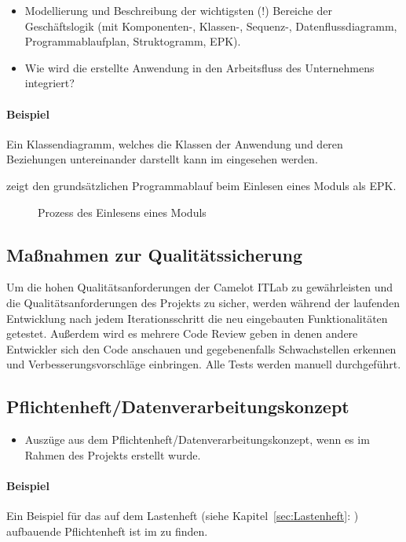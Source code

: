 \begin{itemize}
	\item Modellierung und Beschreibung der wichtigsten (!) Bereiche der Geschäftslogik (\zB mit Kom\-po\-nen\-ten-, Klassen-, Sequenz-, Datenflussdiagramm, Programmablaufplan, Struktogramm, \ac{EPK}).
	\item Wie wird die erstellte Anwendung in den Arbeitsfluss des Unternehmens integriert?
\end{itemize}

\paragraph{Beispiel}
Ein Klassendiagramm, welches die Klassen der Anwendung und deren Beziehungen untereinander darstellt kann im  eingesehen werden.

 zeigt den grundsätzlichen Programmablauf beim Einlesen eines Moduls als \ac{EPK}.
\begin{figure}[htb]
\centering
{}
\caption{Prozess des Einlesens eines Moduls}
\label{fig:Modulimport}
\end{figure}


\subsection{Maßnahmen zur Qualitätssicherung}
\label{sec:Qualitaetssicherung}
Um die hohen Qualitätsanforderungen der Camelot ITLab zu gewährleisten und die Qualitätsanforderungen des Projekts zu sicher, werden während der laufenden Entwicklung nach jedem Iterationsschritt die neu eingebauten Funktionalitäten getestet. Außerdem wird es mehrere Code Review geben in denen andere Entwickler sich den Code anschauen und gegebenenfalls Schwachstellen erkennen und Verbesserungsvorschläge einbringen. Alle Tests werden manuell durchgeführt.  


\subsection{Pflichtenheft/Datenverarbeitungskonzept}
\label{sec:Pflichtenheft}
\begin{itemize}
	\item Auszüge aus dem Pflichtenheft/Datenverarbeitungskonzept, wenn es im Rahmen des Projekts erstellt wurde.
\end{itemize}

\paragraph{Beispiel}
Ein Beispiel für das auf dem Lastenheft (siehe Kapitel~\ref{sec:Lastenheft}: ) aufbauende Pflichtenheft ist im  zu finden.


